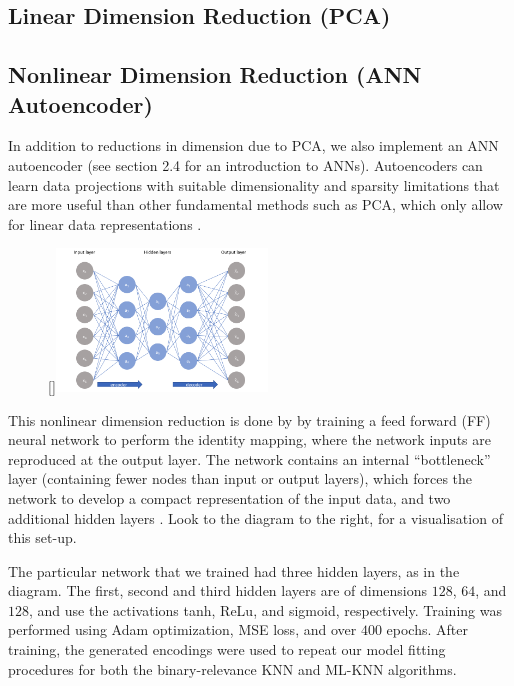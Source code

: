 \documentclass[11pt]{article}
\begin{document}
\subsection{Linear Dimension Reduction (PCA)}

\subsection{Nonlinear Dimension Reduction (ANN Autoencoder)}

In addition to reductions in dimension due to PCA, we also implement an ANN autoencoder (see section 2.4 for an introduction to ANNs). Autoencoders can learn data projections with suitable dimensionality and sparsity limitations that are more useful than other fundamental methods such as PCA, which only allow for linear data representations \autocite{Alkhayrat}.

\begin{figure}
    \begin{center}
        \raisebox{0pt}[\dimexpr{}\baselineskip\relax]{\includegraphics[width=0.5\textwidth]{autoencoder_diagram.png}}
    \end{center}
\end{figure}

This nonlinear dimension reduction is done by by training a feed forward (FF) neural network to perform the identity mapping, where the network inputs are reproduced at the output layer. The network contains an internal “bottleneck” layer (containing fewer nodes than input or output layers), which forces the network to develop a compact representation of the input data, and two additional hidden layers \autocite{Kramer}. Look to the diagram to the right, for a visualisation of this set-up. 

The particular network that we trained had three hidden layers, as in the diagram. The first, second and third hidden layers are of dimensions $128$, $64$, and $128$, and use the activations tanh, ReLu, and sigmoid, respectively. Training was performed using Adam optimization, MSE loss, and over $400$ epochs. After training, the generated encodings were used to repeat our model fitting procedures for both the binary-relevance KNN and ML-KNN algorithms. 
\end{document}
